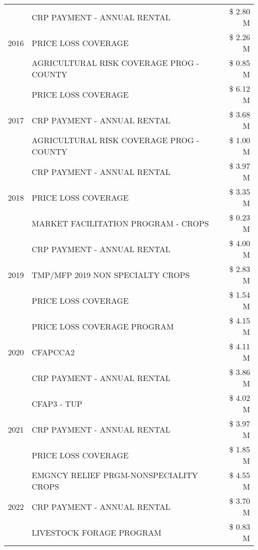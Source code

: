 \begin{tabular}{llr}
\cline{1-3}
\multirow[t]{3}{*}{2016} & CRP PAYMENT - ANNUAL RENTAL & \$ 2.80 M \\
 & PRICE LOSS COVERAGE & \$ 2.26 M \\
 & AGRICULTURAL RISK COVERAGE PROG - COUNTY & \$ 0.85 M \\
\cline{1-3}
\multirow[t]{3}{*}{2017} & PRICE LOSS COVERAGE & \$ 6.12 M \\
 & CRP PAYMENT - ANNUAL RENTAL & \$ 3.68 M \\
 & AGRICULTURAL RISK COVERAGE PROG - COUNTY & \$ 1.00 M \\
\cline{1-3}
\multirow[t]{3}{*}{2018} & CRP PAYMENT - ANNUAL RENTAL & \$ 3.97 M \\
 & PRICE LOSS COVERAGE & \$ 3.35 M \\
 & MARKET FACILITATION PROGRAM - CROPS & \$ 0.23 M \\
\cline{1-3}
\multirow[t]{3}{*}{2019} & CRP PAYMENT - ANNUAL RENTAL & \$ 4.00 M \\
 & TMP/MFP 2019 NON SPECIALTY CROPS & \$ 2.83 M \\
 & PRICE LOSS COVERAGE & \$ 1.54 M \\
\cline{1-3}
\multirow[t]{3}{*}{2020} & PRICE LOSS COVERAGE PROGRAM & \$ 4.15 M \\
 & CFAPCCA2 & \$ 4.11 M \\
 & CRP PAYMENT - ANNUAL RENTAL & \$ 3.86 M \\
\cline{1-3}
\multirow[t]{3}{*}{2021} & CFAP3 - TUP & \$ 4.02 M \\
 & CRP PAYMENT - ANNUAL RENTAL & \$ 3.97 M \\
 & PRICE LOSS COVERAGE & \$ 1.85 M \\
\cline{1-3}
\multirow[t]{3}{*}{2022} & EMGNCY RELIEF PRGM-NONSPECIALITY CROPS & \$ 4.55 M \\
 & CRP PAYMENT - ANNUAL RENTAL & \$ 3.70 M \\
 & LIVESTOCK FORAGE PROGRAM & \$ 0.83 M \\
\cline{1-3}
\bottomrule
\end{tabular}
